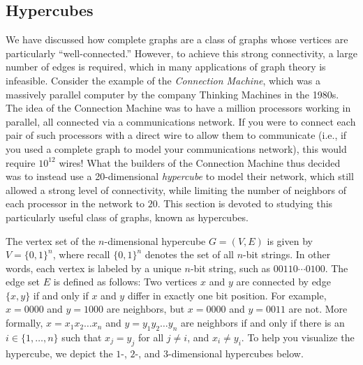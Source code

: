 \documentclass[11pt]{article}
\begin{document}
\subsection{Hypercubes}\label{scn:hyper}

We have discussed how complete graphs are a class of graphs whose vertices are particularly ``well-connected.'' However, to achieve this strong connectivity, a large number of edges is required, which in many applications of graph theory is infeasible. Consider the example of the \emph{Connection Machine}, which was a massively parallel computer by the company Thinking Machines in the 1980s. The idea of the Connection Machine was to have a million processors working in parallel, all connected via a communications network. If you were to connect each pair of such processors with a direct wire to allow them to communicate (i.e., if you used a complete graph to model your communications network), this would require $10^{12}$ wires! What the builders of the Connection Machine thus decided was to instead use a 20-dimensional \emph{hypercube} to model their network, which still allowed a strong level of connectivity, while limiting the number of neighbors of each processor in the network to $20$. This section is devoted to studying this particularly useful class of graphs, known as hypercubes.

The vertex set of the $n$-dimensional hypercube $G=(V,E)$ is given by $V=\{0,1\}^n$, where recall $\{0,1\}^n$ denotes the set of all $n$-bit strings. In other words, each vertex is labeled by a unique $n$-bit string, such as $00110\cdots0100$. The edge set $E$ is defined as follows: Two vertices $x$ and $y$ are connected by edge $\{x,y\}$ if and only if $x$ and $y$ differ in exactly one bit position. For example, $x=0000$ and $y=1000$ are neighbors, but $x=0000$ and $y=0011$ are not. More formally,
$x = x_1 x_2 \ldots x_n$ and $y = y_1 y_2 \ldots y_n$ are neighbors if and only if there is an $i \in \{1,\dots,n\}$ such that $x_j = y_j$ for all $j \neq i$, and $x_i \neq y_i$. To help you visualize the hypercube, we depict the $1$-, $2$-, and $3$-dimensional hypercubes below.
\end{document}
